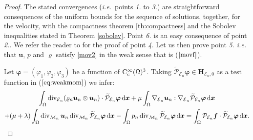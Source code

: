 \documentclass{amsart}
\numberwithin{equation}{section}
\begin{document}
\begin{proof}
The stated convergences ({\emph{i.e.\/}}\ points {\it 1.} to {\it 3.}) are straightforward consequences of the uniform bounds for the sequence of solutions, together, for the velocity, with the compactness theorem \ref{th:compactness} and the Sobolev inequalities stated in Theorem \ref{sobolev}.
Point \textit{6.} is an easy consequence of point \textit{2.}. We refer the reader to \cite{eymard2010convergence} for the proof of point \textit{4.} Let us then prove point {\it 5.} \textit{i.e.}  that ${{\boldsymbol u}}$,  $p$ and ${\varrho}$ satisfy  \eqref{mov2} in the weak sense that is ($\ref{movf}$).
\medskip

Let ${{\boldsymbol \varphi}}=(\varphi_1,\varphi_2,\varphi_3)$ be a function of ${{\rm C}}^\infty_c(\Omega)^3$. 
Taking  $\widetilde{\mathcal P}_{{{\mathcal E}}_n} {{\boldsymbol \varphi}}   \in {{\mathbf{H}_{{{\mathcal E}}_n,0}}}$ as a test function in ($\ref{eq:weakmom}$) we infer:
\begin{multline*}
\int_\Omega \operatorname{div}_{\operatorname{{\mathcal{E}}}_n} ( {\varrho}_n {{\boldsymbol u}}_n \otimes {{\boldsymbol u}}_n) \cdot \widetilde{\mathcal P}_{{{\mathcal E}}_n}{{\boldsymbol \varphi}}   {\, {\rm d}{{\boldsymbol x}}}  + \mu \int_\Omega \nabla_{\operatorname{{\mathcal{E}}}_n} {{\boldsymbol u}}_n :  \nabla_{\operatorname{{\mathcal{E}}}_n}\widetilde{\mathcal P}_{{{\mathcal E}}_n}{{\boldsymbol \varphi}}  {\, {\rm d}{{\boldsymbol x}}} \\ + (\mu+\lambda) \int_\Omega \operatorname{div}_{{{\mathcal M}}_n} {{\boldsymbol u}}_n \operatorname{div}_{{{\mathcal M}}_n} \widetilde{\mathcal P}_{{{\mathcal E}}_n}{{\boldsymbol \varphi}}  {\, {\rm d}{{\boldsymbol x}}} 
-\int_\Omega p_n \operatorname{div}_{{{\mathcal M}}_n} \widetilde{\mathcal P}_{{{\mathcal E}}_n} {{\boldsymbol \varphi}} {\, {\rm d}{{\boldsymbol x}}} = \int_\Omega \mathcal{P}_{{{\mathcal E}}_n}\bm{f} \cdot \widetilde{\mathcal P}_{{{\mathcal E}}_n}{{\boldsymbol \varphi}}  {\, {\rm d}{{\boldsymbol x}}}.
\end{multline*}


\end{proof}
\end{document}

